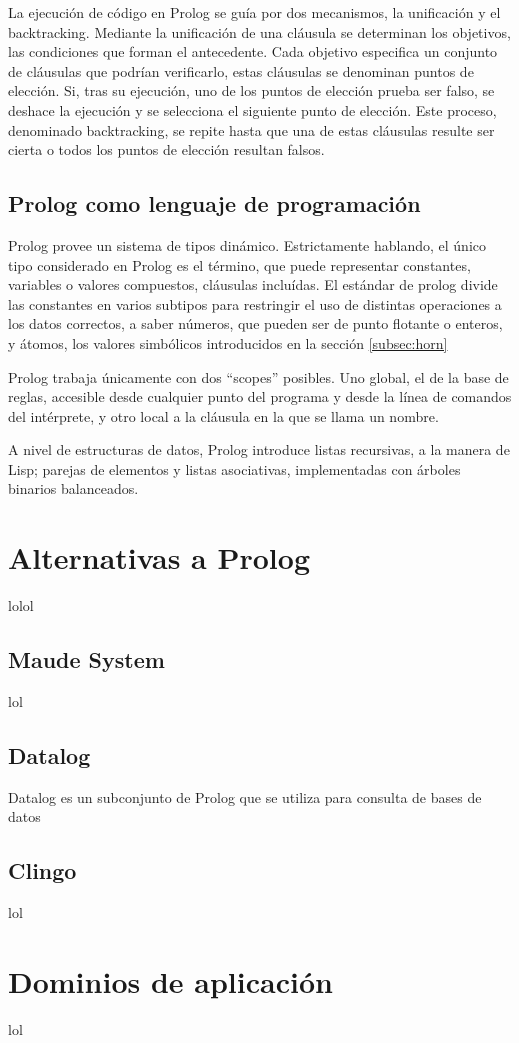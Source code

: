\documentclass[11pt,captions=nooneline,DIV=14, parskip=full]{scrartcl}
\begin{document}
La ejecución de código en Prolog se guía por dos mecanismos, la unificación y el backtracking. Mediante la unificación de una cláusula se determinan los objetivos, las condiciones que forman el antecedente. Cada objetivo especifica un conjunto de cláusulas que podrían verificarlo, estas cláusulas se denominan puntos de elección. Si, tras su ejecución, uno de los puntos de elección prueba ser falso, se deshace la ejecución y se selecciona el siguiente punto de elección. Este proceso, denominado backtracking, se repite hasta que una de estas cláusulas resulte ser cierta o todos los puntos de elección resultan falsos.

\subsection{Prolog como lenguaje de programación}
Prolog provee un sistema de tipos dinámico. Estrictamente hablando, el único tipo considerado en Prolog es el término, que puede representar constantes, variables o valores compuestos, cláusulas incluídas. El estándar de prolog divide las constantes en varios subtipos para restringir el uso de distintas operaciones a los datos correctos, a saber números, que pueden ser de punto flotante o enteros, y átomos, los valores simbólicos introducidos en la sección \ref{subsec:horn}

Prolog trabaja únicamente con dos ``scopes'' posibles. Uno global, el de la base de reglas, accesible desde cualquier punto del programa y desde la línea de comandos del intérprete, y otro local a la cláusula en la que se llama un nombre.

A nivel de estructuras de datos, Prolog introduce listas recursivas, a la manera de Lisp; parejas de elementos y listas asociativas, implementadas con árboles binarios balanceados.

\section{Alternativas a Prolog}
\label{sec:alt-prolog}
lolol

\subsection{Maude System}
lol

\subsection{Datalog}
Datalog es un subconjunto de Prolog que se utiliza para consulta de bases de datos

\subsection{Clingo}
lol

\section{Dominios de aplicación}
lol
\end{document}
